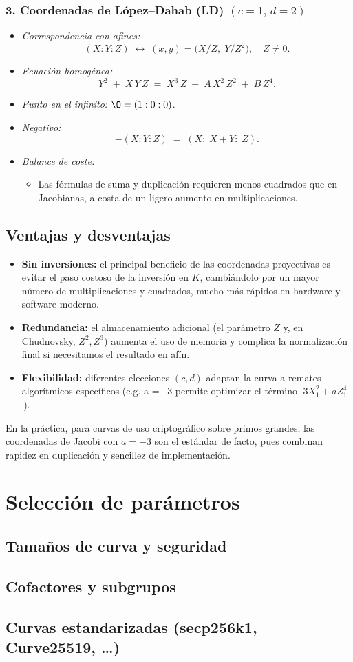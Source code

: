 \subsubsection*{3. Coordenadas de López–Dahab (LD) \((c=1,\,d=2)\)}

\begin{itemize}
  \item \emph{Correspondencia con afines:}
  \[
    (X:Y:Z)\;\longleftrightarrow\;(x,y)=\bigl(X/Z,\;Y/Z^2\bigr),\quad Z\neq0.
  \]
  \item \emph{Ecuación homogénea:}
  \[
    Y^2 \;+\; X\,Y\,Z \;=\; X^3\,Z \;+\; A\,X^2\,Z^2 \;+\; B\,Z^4.
  \]
  \item \emph{Punto en el infinito:} \(\O = (1:0:0)\).  
  \item \emph{Negativo:} 
  \[
    -(X:Y:Z) \;=\; (X:\;X+Y:\;Z).
  \]
  \item \emph{Balance de coste:}  
    \begin{itemize}
      \item Las fórmulas de suma y duplicación requieren menos cuadrados que en Jacobianas, a costa de un ligero aumento en multiplicaciones.
    \end{itemize}
\end{itemize}

\subsection{Ventajas y desventajas}
\begin{itemize}
  \item \textbf{Sin inversiones:} el principal beneficio de las coordenadas proyectivas es evitar el paso costoso de la inversión en \(K\), cambiándolo por un mayor número de multiplicaciones y cuadrados, mucho más rápidos en hardware y software moderno.
  \item \textbf{Redundancia:} el almacenamiento adicional (el parámetro \(Z\) y, en Chudnovsky, \(Z^2,Z^3\)) aumenta el uso de memoria y complica la normalización final si necesitamos el resultado en afín.
  \item \textbf{Flexibilidad:} diferentes elecciones \((c,d)\) adaptan la curva a remates algorítmicos específicos (e.g. a = –3 permite optimizar el término \(\;3X_1^2 + aZ_1^4\)\,).
\end{itemize}

En la práctica, para curvas de uso criptográfico sobre primos grandes, las coordenadas de Jacobi con \(a=-3\) son el estándar de facto, pues combinan rapidez en duplicación y sencillez de implementación.


\section{Selección de parámetros}
\subsection{Tamaños de curva y seguridad}
\subsection{Cofactores y subgrupos}
\subsection{Curvas estandarizadas (secp256k1, Curve25519, …)}